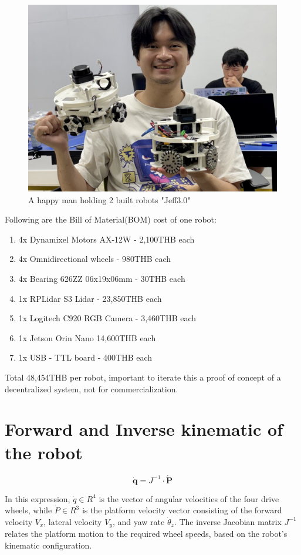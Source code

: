\begin{figure} [H]
    \centering
    \includegraphics[width=0.65\linewidth]{assets/images/hardware/IMG_8290.jpeg}
    \caption{A happy man holding 2 built robots "Jeff3.0"}
    \label{fig:have2robots}
\end{figure}


Following are the Bill of Material(BOM) cost of one robot: 
\begin{enumerate}
    \item 4x Dynamixel Motors AX-12W - 2,100THB each
    \item 4x Omnidirectional wheels - 980THB each 
    \item 4x Bearing 626ZZ 06x19x06mm - 30THB each
    \item 1x RPLidar S3 Lidar - 23,850THB each 
    \item 1x Logitech C920 RGB Camera - 3,460THB each
    \item 1x Jetson Orin Nano 14,600THB each
    \item 1x USB - TTL board - 400THB each
\end{enumerate}
Total 48,454THB per robot, important to iterate this a proof of concept of a decentralized system, not for commercialization.


\section{Forward and Inverse kinematic of the robot}
\[
\dot{\mathbf{q}} = J^{-1} \cdot \dot{\mathbf{P}}
\]

In this expression, $\dot{q} \in R^4$ is the vector of angular velocities of the four drive wheels, while $\dot{P} \in R^3$ is the platform velocity vector consisting of the forward velocity $V_x$, lateral velocity $V_y$, and yaw rate $\dot{\theta}_z$. The inverse Jacobian matrix $J^{-1}$ relates the platform motion to the required wheel speeds, based on the robot's kinematic configuration.

